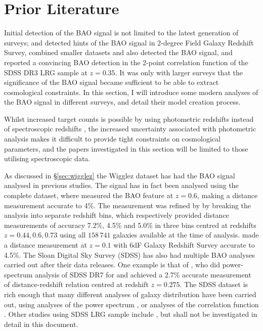 \documentclass[titlesmallcaps, examinerscopy, copyrightpage]{uqthesis}
\begin{document}
\chapter{Prior Literature}


Initial detection of the BAO signal is not limited to the latest generation of surveys;
\cite{ColePercival2005} and \citet{PercivalBaugh2001} detected hints of the BAO signal in 2-degree Field Galaxy Redshift Survey,  \citet{MillerNichol2001} combined smaller datasets and also detected the BAO signal, and \citet{EisensteinZehavi2005} reported a convincing BAO detection in the 2-point correlation function of the SDSS \citep[SDSS]{YorkAdelmanAnderson2000} DR3 LRG sample at $z = 0.35$. It was only with larger surveys that the significance of the BAO signal became sufficient to be able to extract cosmological constraints.  In this section, I will introduce some modern analyses of the BAO signal in different surveys, and detail their model creation process.

Whilst increased target counts is possible by using photometric redshifts instead of spectroscopic redshifts \citep[see][for analysis of the BAO signal from the SDSS Luminous Red Galaxies (LRGs) catalogue]{BlakeCollister2007,Padmanabhan2007,HoCuesta2012}, the increased uncertainty associated with photometric analysis makes it difficult to provide tight constraints on cosmological parameters, and the papers investigated in this section will be limited to those utilising spectroscopic data.

As discussed in \S\ref{sec:wigglez} the Wigglez dataset has had the BAO signal analysed in previous studies. The signal has in fact been analysed using the complete dataset, where \citet{BlakeKazin2011} measured the BAO feature at $z=0.6$, making a distance measurement accurate to 4\%. The measurement was refined by  \citet{BlakeDavis2011} by breaking the analysis into separate redshift bins, which respectively provided distance measurements of accuracy 7.2\%, 4.5\% and 5.0\% in three bins centred at redshifts $z=0.44,0.6,0.73$ using all $158\,741$ galaxies available at the time of analysis. \citet{BeutlerBlake2011} made a distance measurement at $z=0.1$ with 6dF Galaxy Redshift Survey \cite[6dFGRS:][]{JonesRead2009} accurate to 4.5\%. The Sloan Digital Sky Survey (SDSS) has also had multiple BAO analyses carried out after their data releases. One example is that of \citet{PercivalReid2010}, who did power-spectrum analysis of SDSS DR7 for and achieved a 2.7\% accurate measurement of distance-redshift relation centred at redshift $z=0.275$. The SDSS dataset is rich enough that many different analyses of galaxy distribution have been carried out, using analyses of the power spectrum \citep{TegmarkBlanton2004,Huetsi2005,BlakeCollister2007,Padmanabhan2007, PercivalCole2007,PercivalReid2010, ReidPercival2010}, or analyses of the correlation function \citep{EisensteinZehavi2005, Sanchez2009, OkumuraMatsubara2008, CabreGaztanaga2009, Martinez2009,KazinBlanton2010,ChuangWangHemantha2012}. Other studies using SDSS LRG sample include \citet{Huetsi2006, PercivalNichol2007,Sanchez2009, KazinBlanton2010}, but shall not be investigated in detail in this document.
\end{document}
